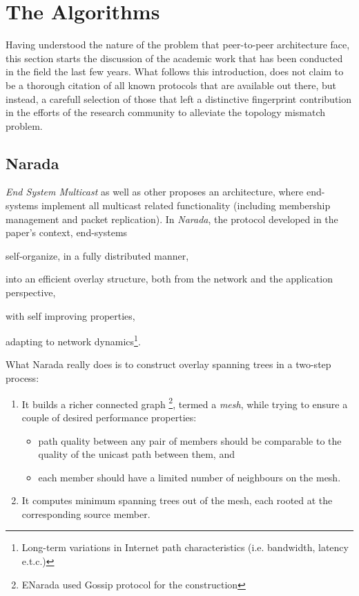 \documentclass[a4paper,10pt]{article}
\begin{document}
\section{The Algorithms}
Having understood the nature of the problem that peer-to-peer architecture face, this section starts the discussion of the academic work that has been conducted in the field the last few years. What follows this introduction, does not claim to be a thorough citation of all known protocols that are available out there, but instead, a carefull selection of those that left a distinctive fingerprint contribution in the efforts of the research community to alleviate the topology mismatch problem.

\subsection{Narada}
\emph{End System Multicast} \cite{chu_esm_2000, chu_esm_2001, chu_esm_2002} as well as other  proposes an architecture, where end-systems implement all multicast related functionality (including membership management and packet replication). In \emph{Narada}, the protocol developed in the paper's context, end-systems
\begin{inparaenum}
  \item self-organize, in a fully distributed manner,
  \item into an efficient overlay structure, both from the network and the application perspective,
  \item with self improving properties,
  \item adapting to network dynamics\footnote{Long-term variations in Internet path characteristics (i.e. bandwidth, latency e.t.c.)}.
\end{inparaenum}

What Narada really does is to construct overlay spanning trees in a two-step process:
\begin{enumerate}
  \item It builds a richer connected graph \footnote{ENarada \cite{li_enarada_2008} used Gossip protocol for the construction}, termed a \emph{mesh}, while trying to ensure a couple of desired performance properties:
    \begin{itemize}
      \item path quality between any pair of members should be comparable to the quality of the unicast path between them, and
      \item each member should have a limited number of neighbours on the mesh.
    \end{itemize}

  \item It computes minimum spanning trees out of the mesh, each rooted at the corresponding source member.
\end{enumerate}
\end{document}

